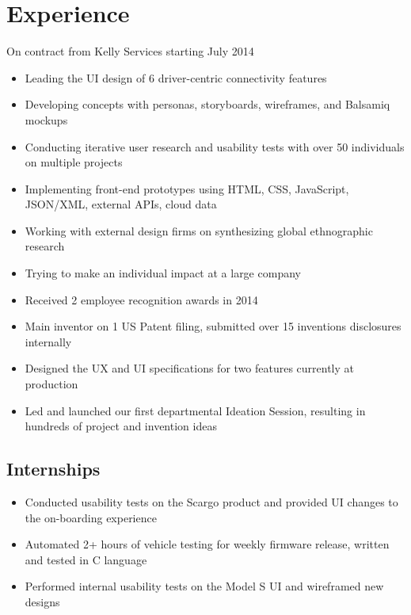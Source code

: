 \documentclass[10pt,a4paper,sans]{moderncv}        %
\begin{document}
\makecvtitle


\section{Experience}
\smallskip
{}
{On contract from Kelly Services starting July 2014}
{{}%
\smallskip
\begin{itemize} 
	
	\item Leading the UI design of 6 driver-centric connectivity features 
	\item Developing concepts with personas, storyboards, wireframes, and Balsamiq mockups 
	\item Conducting iterative user research and usability tests with over 50 individuals on multiple projects
	\item  Implementing front-end prototypes using HTML, CSS, JavaScript, JSON/XML, external APIs, cloud data
	\item Working with external design firms on synthesizing global ethnographic research
	\item Trying to make an individual impact at a large company
	\bigskip
	\item Received 2 employee recognition awards in 2014
	\item Main inventor on 1 US Patent filing, submitted over 15 inventions disclosures internally
	\item Designed the UX and UI specifications for two features currently at production
	\item Led and launched our first departmental Ideation Session, resulting in hundreds of project and invention ideas
	
\end{itemize}}

\bigskip
\subsection{Internships}
\bigskip
{}
{{}%
\begin{itemize} 
	\item  Conducted usability tests on the Scargo product and provided UI changes to the on-boarding experience
\end{itemize}}

{{}%
\begin{itemize} 
	\item  Automated 2+ hours of vehicle testing for weekly firmware release, written and tested in C language
	\item  Performed internal usability tests on the Model S UI and wireframed new designs
\end {itemize}}
\end{document}
